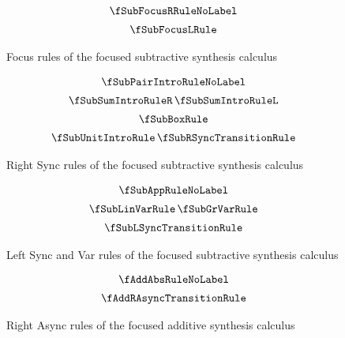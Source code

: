 \begin{figure}[H]
  \begin{align*}
\begin{array}{c}
  \fSubFocusRRuleNoLabel
  \\[0.5em]
  \fSubFocusLRule
  \end{array}
  \end{align*}
  \caption{Focus rules of the focused subtractive synthesis calculus}
  \label{fig:focus-sub-focus}
\end{figure}

\begin{figure}[H]
  \begin{align*}
\begin{array}{c}
\fSubPairIntroRuleNoLabel
  \\[0.5em]
  \fSubSumIntroRuleR
  \,
  \fSubSumIntroRuleL
  \\[0.5em]
  \fSubBoxRule
  \\[0.5em]
  \fSubUnitIntroRule
  \,
  \fSubRSyncTransitionRule
  \end{array}
  \end{align*}
  \caption{Right Sync rules of the focused subtractive synthesis calculus}
  \label{fig:focus-sub-right-sync}
\end{figure}

\begin{figure}[H]
  \begin{align*}
\begin{array}{c}
  \fSubAppRuleNoLabel
  \\[0.5em]
  \fSubLinVarRule
  \,
  \fSubGrVarRule
  \\[0.5em]
  \fSubLSyncTransitionRule
  \end{array}
  \end{align*}
  \caption{Left Sync and Var rules of the focused subtractive synthesis calculus}
  \label{fig:focus-sub-left-sync}
\end{figure}

\begin{figure}[H]
  \begin{align*}
\begin{array}{c}
  \fAddAbsRuleNoLabel
  \\[0.5em]
  \fAddRAsyncTransitionRule
  \end{array}
  \end{align*}
  \caption{Right Async rules of the focused additive synthesis calculus}
  \label{fig:focus-add-right-async}
\end{figure}

